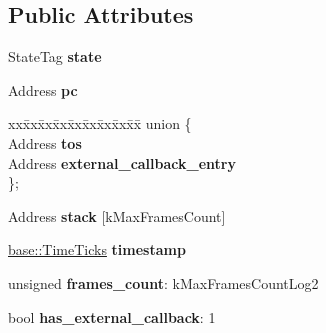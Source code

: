 \subsection*{Public Attributes}
\begin{DoxyCompactItemize}
\item 
State\+Tag {\bfseries state}\hypertarget{structv8_1_1internal_1_1_tick_sample_ad916ea9e1b1dd6c47309396e8153ef3f}{}\label{structv8_1_1internal_1_1_tick_sample_ad916ea9e1b1dd6c47309396e8153ef3f}

\item 
Address {\bfseries pc}\hypertarget{structv8_1_1internal_1_1_tick_sample_a8c5549c8d314a97bcfa3900dffadc72f}{}\label{structv8_1_1internal_1_1_tick_sample_a8c5549c8d314a97bcfa3900dffadc72f}

\item 
\begin{tabbing}
xx\=xx\=xx\=xx\=xx\=xx\=xx\=xx\=xx\=\kill
union \{\\
\>Address {\bfseries tos}\\
\>Address {\bfseries external\_callback\_entry}\\
\}; \hypertarget{structv8_1_1internal_1_1_tick_sample_a7812ac25ad1568f139005e7567909566}{}\label{structv8_1_1internal_1_1_tick_sample_a7812ac25ad1568f139005e7567909566}
\\

\end{tabbing}\item 
Address {\bfseries stack} \mbox{[}k\+Max\+Frames\+Count\mbox{]}\hypertarget{structv8_1_1internal_1_1_tick_sample_a79ef09cd1d44de501069ec38e7a0700e}{}\label{structv8_1_1internal_1_1_tick_sample_a79ef09cd1d44de501069ec38e7a0700e}

\item 
\hyperlink{classv8_1_1base_1_1_time_ticks}{base\+::\+Time\+Ticks} {\bfseries timestamp}\hypertarget{structv8_1_1internal_1_1_tick_sample_a5955372cc02222b2db1fff8504ef45e5}{}\label{structv8_1_1internal_1_1_tick_sample_a5955372cc02222b2db1fff8504ef45e5}

\item 
unsigned {\bfseries frames\+\_\+count}\+: k\+Max\+Frames\+Count\+Log2\hypertarget{structv8_1_1internal_1_1_tick_sample_ac7981f5af4beecbce4a3acee6eb7a442}{}\label{structv8_1_1internal_1_1_tick_sample_ac7981f5af4beecbce4a3acee6eb7a442}

\item 
bool {\bfseries has\+\_\+external\+\_\+callback}\+: 1\hypertarget{structv8_1_1internal_1_1_tick_sample_aab6f962edf414a9fc191ed879921b13d}{}\label{structv8_1_1internal_1_1_tick_sample_aab6f962edf414a9fc191ed879921b13d}


\end{DoxyCompactItemize}
